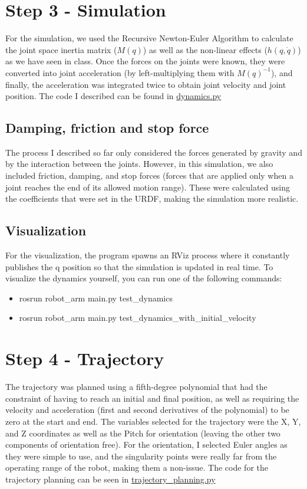 \documentclass[12pt,a4paper]{article}
\begin{document}
\section{Step 3 - Simulation}

For the simulation, we used the Recursive Newton-Euler Algorithm to calculate
the joint space inertia matrix ($M(q)$) as well as the non-linear effects ($h(q,\dot{q})$)
as we have seen in class. Once the forces on the joints were known, they were converted
into joint acceleration (by left-multiplying them with $M(q)^{-1}$), and 
finally, the acceleration was integrated twice to obtain joint velocity and joint position.
The code I described can be found in
\href{https://github.com/lucaSartore/RobotArm/blob/master/src/robot_arm/src/data_processing/dynamics.py}{dynamics.py}

\subsection{Damping, friction and stop force}
The process I described so far only considered the forces generated
by gravity and by the interaction between the joints. However, in this simulation,
we also included friction, damping, and stop forces (forces that are applied only when a joint
reaches the end of its allowed motion range). These were calculated
using the coefficients that were set in the URDF, making the simulation more realistic.


\subsection{Visualization}

For the visualization, the program spawns an RViz process where it constantly 
publishes the q position so that the simulation is updated in real time.
To visualize the dynamics yourself, you can run one of the following commands:
\begin{itemize}
    \item rosrun robot\_arm main.py test\_dynamics
    \item rosrun robot\_arm main.py test\_dynamics\_with\_initial\_velocity
\end{itemize}


\section{Step 4 - Trajectory}
The trajectory was planned using a fifth-degree polynomial that had the constraint of having
to reach an initial and final position, as well as requiring the
velocity and acceleration (first and second derivatives of the polynomial)
to be zero at the start and end.
The variables selected for the trajectory were the X, Y, and Z coordinates
as well as the Pitch for orientation (leaving the other two components of orientation
free).
For the orientation, I selected Euler angles as they were simple to use, and the singularity
points were really far from the operating range of the robot, making them a non-issue.
The code for the trajectory planning can be seen in
\href{https://github.com/lucaSartore/RobotArm/blob/master/src/robot_arm/src/data_processing/trajectory_planning.py}{trajectory\_planning.py}
\end{document}
